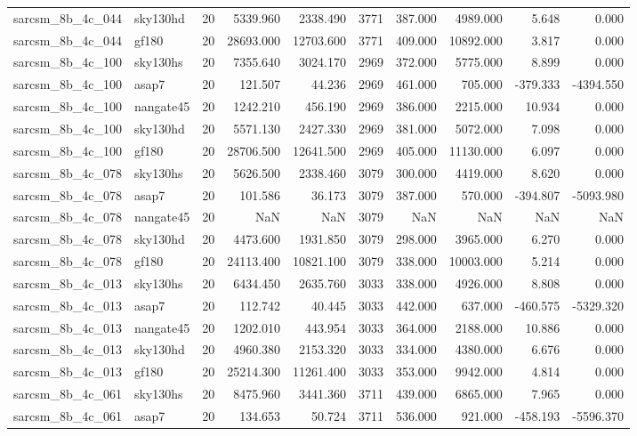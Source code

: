 \begin{tabular}{llrrrrrrrr}
sarcsm\_8b\_4c\_044 & sky130hd & 20 & 5339.960 & 2338.490 & 3771 & 387.000 & 4989.000 & 5.648 & 0.000 \\
sarcsm\_8b\_4c\_044 & gf180 & 20 & 28693.000 & 12703.600 & 3771 & 409.000 & 10892.000 & 3.817 & 0.000 \\
sarcsm\_8b\_4c\_100 & sky130hs & 20 & 7355.640 & 3024.170 & 2969 & 372.000 & 5775.000 & 8.899 & 0.000 \\
sarcsm\_8b\_4c\_100 & asap7 & 20 & 121.507 & 44.236 & 2969 & 461.000 & 705.000 & -379.333 & -4394.550 \\
sarcsm\_8b\_4c\_100 & nangate45 & 20 & 1242.210 & 456.190 & 2969 & 386.000 & 2215.000 & 10.934 & 0.000 \\
sarcsm\_8b\_4c\_100 & sky130hd & 20 & 5571.130 & 2427.330 & 2969 & 381.000 & 5072.000 & 7.098 & 0.000 \\
sarcsm\_8b\_4c\_100 & gf180 & 20 & 28706.500 & 12641.500 & 2969 & 405.000 & 11130.000 & 6.097 & 0.000 \\
sarcsm\_8b\_4c\_078 & sky130hs & 20 & 5626.500 & 2338.460 & 3079 & 300.000 & 4419.000 & 8.620 & 0.000 \\
sarcsm\_8b\_4c\_078 & asap7 & 20 & 101.586 & 36.173 & 3079 & 387.000 & 570.000 & -394.807 & -5093.980 \\
sarcsm\_8b\_4c\_078 & nangate45 & 20 & NaN & NaN & 3079 & NaN & NaN & NaN & NaN \\
sarcsm\_8b\_4c\_078 & sky130hd & 20 & 4473.600 & 1931.850 & 3079 & 298.000 & 3965.000 & 6.270 & 0.000 \\
sarcsm\_8b\_4c\_078 & gf180 & 20 & 24113.400 & 10821.100 & 3079 & 338.000 & 10003.000 & 5.214 & 0.000 \\
sarcsm\_8b\_4c\_013 & sky130hs & 20 & 6434.450 & 2635.760 & 3033 & 338.000 & 4926.000 & 8.808 & 0.000 \\
sarcsm\_8b\_4c\_013 & asap7 & 20 & 112.742 & 40.445 & 3033 & 442.000 & 637.000 & -460.575 & -5329.320 \\
sarcsm\_8b\_4c\_013 & nangate45 & 20 & 1202.010 & 443.954 & 3033 & 364.000 & 2188.000 & 10.886 & 0.000 \\
sarcsm\_8b\_4c\_013 & sky130hd & 20 & 4960.380 & 2153.320 & 3033 & 334.000 & 4380.000 & 6.676 & 0.000 \\
sarcsm\_8b\_4c\_013 & gf180 & 20 & 25214.300 & 11261.400 & 3033 & 353.000 & 9942.000 & 4.814 & 0.000 \\
sarcsm\_8b\_4c\_061 & sky130hs & 20 & 8475.960 & 3441.360 & 3711 & 439.000 & 6865.000 & 7.965 & 0.000 \\
sarcsm\_8b\_4c\_061 & asap7 & 20 & 134.653 & 50.724 & 3711 & 536.000 & 921.000 & -458.193 & -5596.370 \\

\end{tabular}
